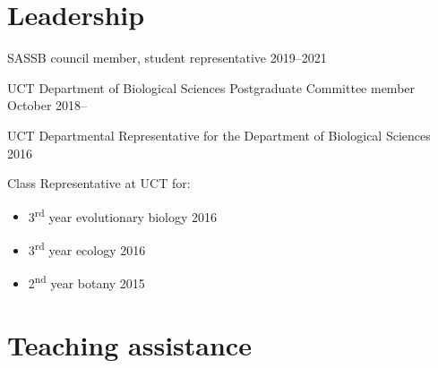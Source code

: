 \documentclass[10pt]{article}
\begin{document}
\section*{Leadership} %

SASSB council member, student representative                   \hfill 2019--2021

UCT Department of Biological Sciences Postgraduate Committee member
                                                      \hfill October 2018--

UCT Departmental Representative for the Department of Biological Sciences
                                                                     \hfill 2016

Class Representative at UCT for:

\begin{itemize}[noitemsep, nolistsep]
  \item 3\textsuperscript{rd} year evolutionary biology              \hfill 2016
  \item 3\textsuperscript{rd} year ecology                           \hfill 2016
  \item 2\textsuperscript{nd} year botany                            \hfill 2015
\end{itemize}

\section*{Teaching assistance} %

\end{document}
